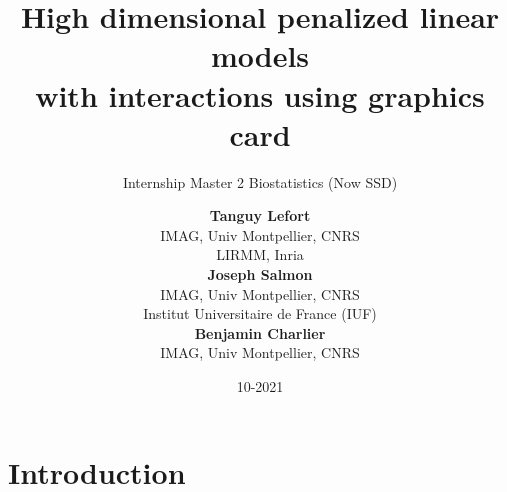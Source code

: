 \documentclass[10pt,aspectratio=43]{beamer}
\title[] %
{High dimensional penalized linear models \\ with interactions using graphics card
} %
\subtitle{Internship Master 2 Biostatistics (Now SSD)}
\date{10-2021} %
\author[]%
{%
    {\textbf{Tanguy Lefort}\\ IMAG, Univ Montpellier, CNRS\\ LIRMM, Inria}\\[0.3cm]%
    {\textbf{Joseph Salmon}\\ IMAG, Univ Montpellier, CNRS \\ Institut Universitaire de France (IUF)}\\[0.3cm]%
    {\textbf{Benjamin Charlier}\\ IMAG, Univ Montpellier, CNRS}%
}
\institute[
]
{%
}
\begin{document}
\maketitle




\section*{Introduction}
\label{sec:Introduction}
\end{document}

